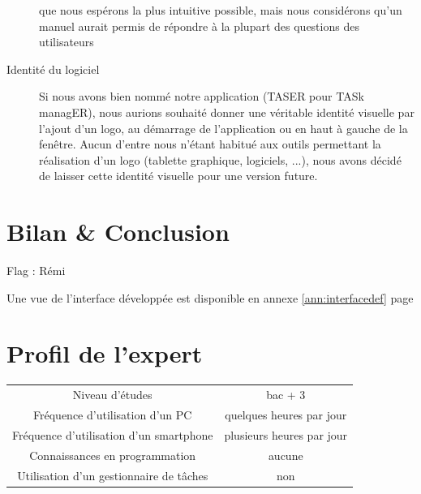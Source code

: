 \documentclass[11pt]{article}
\begin{document}
\begin{description}
  que nous espérons la plus intuitive possible, mais nous considérons
  qu'un manuel aurait permis de répondre à la plupart des questions
  des utilisateurs
\item[Identité du logiciel] Si nous avons bien nommé notre application
  (TASER pour TASk managER), nous aurions souhaité donner une
  véritable identité visuelle par l'ajout d'un logo, au démarrage de
  l'application ou en haut à gauche de la fenêtre. Aucun d'entre nous
  n'étant habitué aux outils permettant la réalisation d'un logo
  (tablette graphique, logiciels, ...), nous avons décidé de laisser
  cette identité visuelle pour une version future.
\end{description}




\section{Bilan \& Conclusion}

Flag : Rémi

Une vue de l'interface développée est disponible en annexe
\ref{ann:interfacedef} page \pageref{fig:interfacedefscreen}


\printglossaries

\appendix

\section{Profil de l'expert}
\label{sec:profilExpert}

\begin{tabular}[h]{c|c}
  Niveau d'études & bac + 3\\
  Fréquence d'utilisation d'un PC & quelques heures par jour\\
  Fréquence d'utilisation d'un smartphone & plusieurs heures par jour\\
  Connaissances en programmation & aucune\\
  Utilisation d'un gestionnaire de tâches & non\\

\end{tabular}
\end{document}
